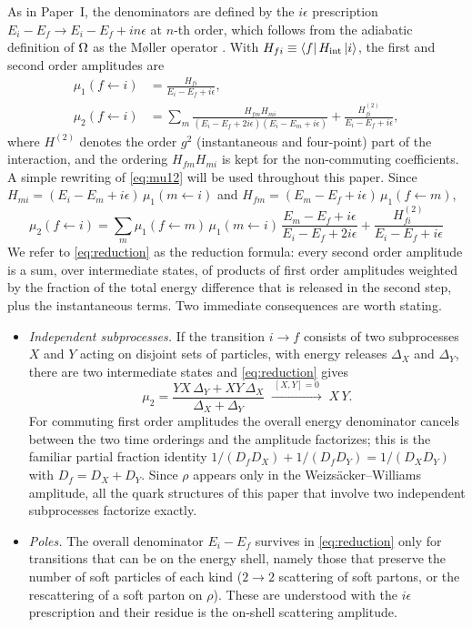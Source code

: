 As in Paper~I, the denominators are defined by the $i\epsilon$ prescription
$E_{i}-E_{f}\to E_{i}-E_{f}+in\epsilon$ at $n$-th order, which follows from the adiabatic definition of
$\Omega$ as the M{\o}ller operator \cite{Munier:2025unitary,Kovner:2018fxj}. With
$H_{fi}\equiv\left\langle f\right|H_{\rm int}\left|i\right\rangle$, the first and second order amplitudes are
\begin{align}
\mu_{1}(f\leftarrow i)&=\frac{H_{fi}}{E_{i}-E_{f}+i\epsilon},
\nonumber\\
\mu_{2}(f\leftarrow i)&=\sum_{m}\frac{H_{fm}H_{mi}}{(E_{i}-E_{f}+2i\epsilon)(E_{i}-E_{m}+i\epsilon)}
+\frac{H^{(2)}_{fi}}{E_{i}-E_{f}+i\epsilon},
\label{eq:mu12}
\end{align}
where $H^{(2)}$ denotes the order $g^{2}$ (instantaneous and four-point) part of the
interaction, and the ordering $H_{fm}H_{mi}$ is kept for the non-commuting coefficients. A
simple rewriting of \eqref{eq:mu12} will be used throughout this paper. Since
$H_{mi}=(E_{i}-E_{m}+i\epsilon)\,\mu_{1}(m\leftarrow i)$ and
$H_{fm}=(E_{m}-E_{f}+i\epsilon)\,\mu_{1}(f\leftarrow m)$,
\begin{equation}
\boxed{\;
\mu_{2}(f\leftarrow i)=\sum_{m}\mu_{1}(f\leftarrow m)\,\mu_{1}(m\leftarrow i)\,
\frac{E_{m}-E_{f}+i\epsilon}{E_{i}-E_{f}+2i\epsilon}
+\frac{H^{(2)}_{fi}}{E_{i}-E_{f}+i\epsilon}\;}
\label{eq:reduction}
\end{equation}
We refer to \eqref{eq:reduction} as the reduction formula: every second order amplitude is a sum,
over intermediate states, of products of first order amplitudes weighted by the fraction of the
total energy difference that is released in the second step, plus the instantaneous terms.
Two immediate consequences are worth stating.
\begin{itemize}
\item[(i)] \emph{Independent subprocesses.} If the transition $i\to f$ consists of two subprocesses
$X$ and $Y$ acting on disjoint sets of particles, with energy releases $\Delta_{X}$ and $\Delta_{Y}$,
there are two intermediate states and \eqref{eq:reduction} gives
\begin{equation}
\mu_{2}=\frac{Y X\,\Delta_{Y}+X Y\,\Delta_{X}}{\Delta_{X}+\Delta_{Y}}
\;\xrightarrow{\;[X,Y]=0\;}\;X\,Y .
\label{eq:factor}
\end{equation}
For commuting first order amplitudes the overall energy denominator cancels between the two
time orderings and the amplitude factorizes; this is the familiar partial fraction identity
$1/(D_{f}D_{X})+1/(D_{f}D_{Y})=1/(D_{X}D_{Y})$ with $D_{f}=D_{X}+D_{Y}$. Since $\rho$ appears
only in the Weizs\"acker--Williams amplitude, all the quark structures of this paper that involve
two independent subprocesses factorize exactly.
\item[(ii)] \emph{Poles.} The overall denominator $E_{i}-E_{f}$ survives in \eqref{eq:reduction} only
for transitions that can be on the energy shell, namely those that preserve the number of soft
particles of each kind ($2\to2$ scattering of soft partons, or the rescattering of a soft parton
on $\rho$). These are understood with the $i\epsilon$ prescription and their residue is the
on-shell scattering amplitude.
\end{itemize}
